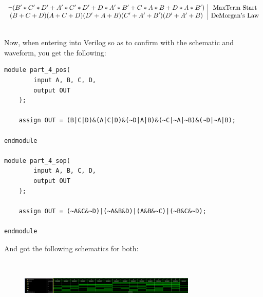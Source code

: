 \begin{centering}
  \begin{displaymath}
  \begin{array}{c | c}
    \neg(B'*C'*D' + A'*C'*D' + D*A'*B' + C*A*B + D*A*B') & $MaxTerm Start$ \\
    (B+C+D)(A+C+D)(D'+A+B)(C'+A'+B')(D'+A'+B) & $DeMorgan's Law$ \\
  \end{array}
  \end{displaymath}
\end{centering}\\
Now, when entering into Verilog so as to confirm with the schematic and waveform, you get the following:
\begin{lstlisting}[caption={Part 4 Verilog Code}, label={Part 4 Verilog}, style=Verilog]
module part_4_pos(
        input A, B, C, D,
        output OUT
    );

    assign OUT = (B|C|D)&(A|C|D)&(~D|A|B)&(~C|~A|~B)&(~D|~A|B);

endmodule

module part_4_sop(
        input A, B, C, D,
        output OUT
    );

    assign OUT = (~A&C&~D)|(~A&B&D)|(A&B&~C)|(~B&C&~D);

endmodule
\end{lstlisting}
And got the following schematics for both:
\begin{figure}[!htbp]
    \centering
    \qquad
\end{figure}\\
\begin{figure}[!htbp]
    \centering
    \includegraphics[width=0.75\textwidth]{part-4-waveform.png}
    \label{Part 2 Waveform}
\end{figure}\\
